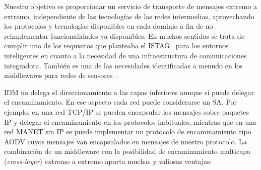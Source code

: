 \documentclass{arco-article}
\newcommand{\fg}[1]{\textit{#1}}
\def \mw {middleware}
\def \mws {middlewares}
\begin{document}
Nuestro objetivo es proporcionar un servicio de transporte de mensajes
extremo a extremo, independiente de las tecnologías de las redes
intermedias, aprovechando los protocolos y tecnologías disponibles en
cada dominio a fin de no reimplementar funcionalidades ya
disponibles. En muchos sentidos se trata de cumplir uno de los
requisitos que planteaba el \ac{ISTAG}~\cite{istag01scenarios4ami}
para los entornos inteligentes en cuanto a la necesidad de una
infraestructura de comunicaciones integradora. También es una de las
necesidades identificadas a menudo en los \mws{} para redes de
sensores~\cite{Romer04ProgrammingParadigms}.

\ac{IDM} no delega el direccionamiento a las capas inferiores aunque
sí puede delegar el encaminamiento. En ese aspecto cada red puede
considerarse un \ac{SA}. Por ejemplo, en una red \ac{TCP/IP} se pueden
encapsular los mensajes sobre paquetes \ac{IP} y delegar el
encaminamiento en los protocolos habituales, mientras que en una red
\ac{MANET} sin \ac{IP} se puede implementar un protocolo de
encaminamiento tipo \ac{AODV} cuyos mensajes van encapsulados en
mensajes de nuestro protocolo. La combinación de un \mw{} con la
posibilidad de encaminamiento multicapa (\fg{cross-layer}) extremo a
extremo aporta muchas y valiosas ventajas:
\end{document}
